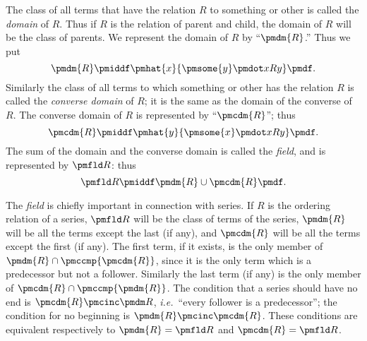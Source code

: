 \documentclass[letterpaper,12pt,openany,leqno]{book}
\begin{document}
The class of all terms that have the relation $R$ to something or other is called the \textit{domain} of $R$. Thus if $R$ is the relation of parent and child, the domain of $R$ will be the class of parents. We represent the domain of $R$ by ``$\pmdm{R}$.'' Thus we put
\[ 
	\pmdm{R} \pmiddf \pmhat{x}\{\pmsome{y}\pmdot xRy\} \pmdf.
\]
Similarly the class of all terms to which something or other has the relation $R$ is called the \textit{converse domain} of $R$; it is the same as the domain of the converse of $R$. The converse domain of $R$ is represented by ``$\pmcdm{R}$''; thus
\[ 
	\pmcdm{R} \pmiddf \pmhat{y}\{\pmsome{x}\pmdot xRy\} \pmdf.
\]
The sum of the domain and the converse domain is called the \textit{field}, and is represented by $\pmfld R$: thus
\[
	\pmfld R \pmiddf \pmdm{R} \cup \pmcdm{R} \pmdf.
\]

The \textit{field} is chiefly important in connection with series. If $R$ is the ordering relation of a series, $\pmfld R$ will be the class of terms of the series, $\pmdm{R}$ will be all the terms except the last (if any), and $\pmcdm{R}$ will be all the terms except the first (if any). The first term, if it exists, is the only member of $\pmdm{R} \cap \pmccmp{\pmcdm{R}}$, since it is the only term which is a predecessor but not a follower. Similarly the last term (if any) is the only member of $\pmcdm{R} \cap \pmccmp{\pmdm{R}}$. The condition that a series should have no end is $\pmcdm{R} \pmcinc \pmdm R$, \textit{i.e.}\ ``every follower is a predecessor''; the condition for no beginning is $\pmdm{R} \pmcinc \pmcdm{R}$. These conditions are equivalent respectively to $\pmdm{R} = \pmfld R$ and $\pmcdm{R} = \pmfld R$.
\end{document}
